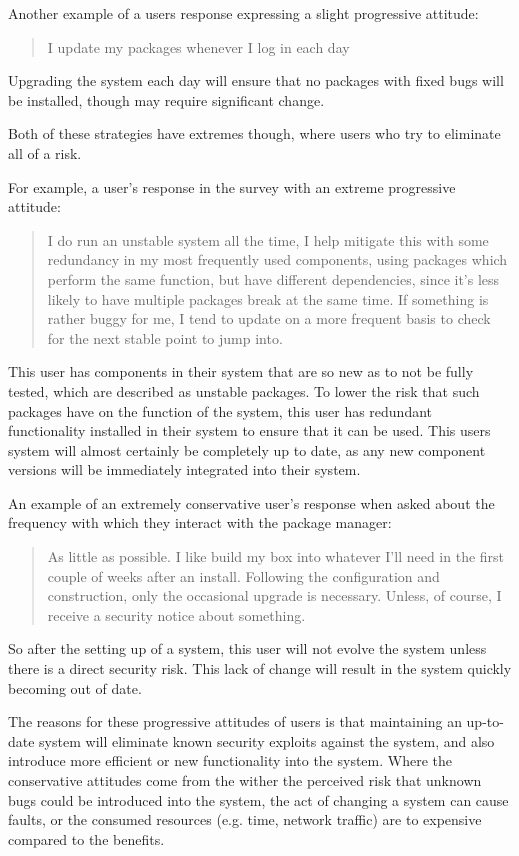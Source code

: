 Another example of a users response expressing a slight progressive attitude:
\begin{quotation}
I update my packages whenever I log in each day
\end{quotation}
Upgrading the system each day will ensure that no packages with fixed bugs will be installed, though may require significant change.

Both of these strategies have extremes though, where users who try to eliminate all of a risk.

For example, a user's response in the survey with an extreme progressive attitude:
\begin{quotation}
I do run an unstable system all the time, I help mitigate this with some redundancy in my most frequently used components, 
using packages which perform the same function, but have different dependencies, since it's less likely to have multiple packages break at the same time. 
If something is rather buggy for me, I tend to update on a more frequent basis to check for the next stable point to jump into.
\end{quotation}
This user has components in their system that are so new as to not be fully tested, which are described as unstable packages.
To lower the risk that such packages have on the function of the system, this user has redundant functionality installed in their system to ensure that it can be used.
This users system will almost certainly be completely up to date, as any new component versions will be immediately integrated into their system.

An example of an extremely conservative user's response when asked about the frequency with which they interact with the package manager:
\begin{quotation}
As little as possible. I like build my box into whatever I'll need in the first couple of weeks after an install. 
Following the configuration and construction, only the occasional upgrade is necessary. 
Unless, of course, I receive a security notice about something.
\end{quotation}
So after the setting up of a system, this user will not evolve the system unless there is a direct security risk.
This lack of change will result in the system quickly becoming out of date.

The reasons for these progressive attitudes of users is that maintaining an up-to-date system will eliminate known security exploits against the system,
and also introduce more efficient or new functionality into the system.
Where the conservative attitudes come from the wither the perceived risk that unknown bugs could be introduced into the system, the act of changing a system can cause faults,
or the consumed resources (e.g. time, network traffic) are to expensive compared to the benefits.

